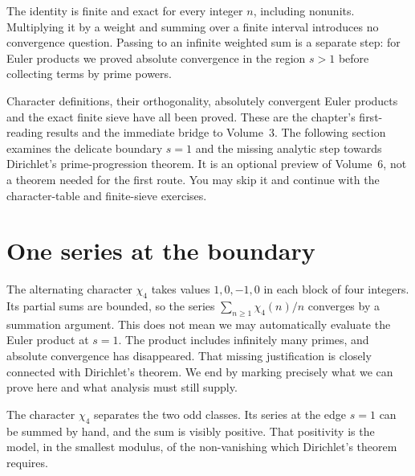The identity is finite and exact for every integer $n$, including nonunits. Multiplying it by a weight and summing over a finite interval introduces no convergence question. Passing to an infinite weighted sum is a separate step: for Euler products we proved absolute convergence in the region $s>1$ before collecting terms by prime powers.

\begin{reminder}
Character definitions, their orthogonality, absolutely convergent
Euler products and the exact finite sieve have all been proved.
These are the chapter's first-reading results and the immediate
bridge to Volume~3. The following section examines the delicate
boundary $s=1$ and the missing analytic step towards Dirichlet's
prime-progression theorem. It is an optional preview of Volume~6,
not a theorem needed for the first route. You may skip it and
continue with the character-table and finite-sieve exercises.
\end{reminder}

\section{One series at the boundary}

The alternating character $\chi_4$ takes values $1,0,-1,0$ in each block of four integers. Its partial sums are bounded, so the series $\sum_{n\ge1}\chi_4(n)/n$ converges by a summation argument. This does not mean we may automatically evaluate the Euler product at $s=1$. The product includes infinitely many primes, and absolute convergence has disappeared. That missing justification is closely connected with Dirichlet's theorem. We end by marking precisely what we can prove here and what analysis must still supply.

The character $\chi_4$ separates the two odd classes. Its series at the edge $s=1$ can be summed by hand, and the sum is visibly positive. That positivity is the model, in the smallest modulus, of the non-vanishing which Dirichlet's theorem requires.

